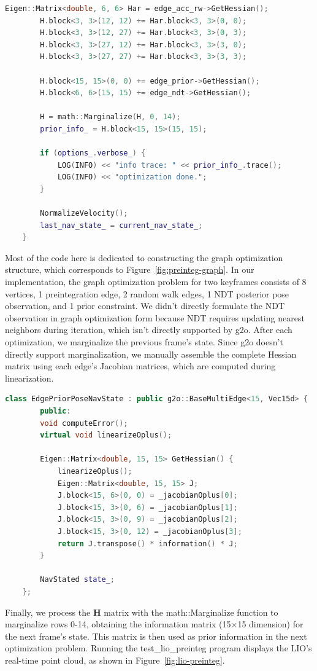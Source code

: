 \begin{lstlisting}[language=c++,caption=src/ch8/lio-preinteg/lio_preinteg.cc]
		Eigen::Matrix<double, 6, 6> Har = edge_acc_rw->GetHessian();
		H.block<3, 3>(12, 12) += Har.block<3, 3>(0, 0);
		H.block<3, 3>(12, 27) += Har.block<3, 3>(0, 3);
		H.block<3, 3>(27, 12) += Har.block<3, 3>(3, 0);
		H.block<3, 3>(27, 27) += Har.block<3, 3>(3, 3);
		
		H.block<15, 15>(0, 0) += edge_prior->GetHessian();
		H.block<6, 6>(15, 15) += edge_ndt->GetHessian();
		
		H = math::Marginalize(H, 0, 14);
		prior_info_ = H.block<15, 15>(15, 15);
		
		if (options_.verbose_) {
			LOG(INFO) << "info trace: " << prior_info_.trace();
			LOG(INFO) << "optimization done.";
		}
		
		NormalizeVelocity();
		last_nav_state_ = current_nav_state_;
	}
\end{lstlisting}

Most of the code here is dedicated to constructing the graph optimization structure, which corresponds to Figure~\ref{fig:preinteg-graph}. In our implementation, the graph optimization problem for two keyframes consists of 8 vertices, 1 preintegration edge, 2 random walk edges, 1 NDT posterior pose observation, and 1 prior constraint. We didn't directly formulate the NDT observation in graph optimization form because NDT requires updating nearest neighbors during iteration, which isn't directly supported by g2o. After each optimization, we marginalize the previous frame's state. Since g2o doesn't directly support marginalization, we manually assemble the complete Hessian matrix using each edge's Jacobian matrices, which are computed during linearization.

\begin{lstlisting}[language=c++,caption=src/common/g2o_types.h]
	class EdgePriorPoseNavState : public g2o::BaseMultiEdge<15, Vec15d> {
		public:
		void computeError();
		virtual void linearizeOplus();
		
		Eigen::Matrix<double, 15, 15> GetHessian() {
			linearizeOplus();
			Eigen::Matrix<double, 15, 15> J;
			J.block<15, 6>(0, 0) = _jacobianOplus[0];
			J.block<15, 3>(0, 6) = _jacobianOplus[1];
			J.block<15, 3>(0, 9) = _jacobianOplus[2];
			J.block<15, 3>(0, 12) = _jacobianOplus[3];
			return J.transpose() * information() * J;
		}
		
		NavStated state_;
	};
\end{lstlisting}

Finally, we process the $\mathbf{H}$ matrix with the math::Marginalize function to marginalize rows 0-14, obtaining the information matrix (15×15 dimension) for the next frame's state. This matrix is then used as prior information in the next optimization problem. Running the test\_lio\_preinteg program displays the LIO's real-time point cloud, as shown in Figure~\ref{fig:lio-preinteg}.

